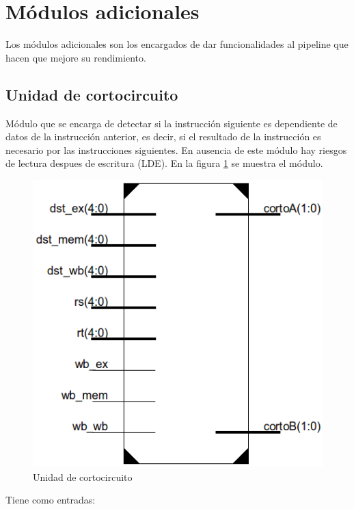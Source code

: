 \section{M\'odulos adicionales}
Los m\'odulos adicionales son los encargados de dar funcionalidades al pipeline que hacen que mejore su rendimiento.

\subsection{Unidad de cortocircuito}
M\'odulo que se encarga de detectar si la instrucci\'on siguiente es dependiente de datos de la instrucci\'on anterior, es decir, si el resultado de la instrucci\'on es necesario por las instrucciones siguientes. En ausencia de este m\'odulo hay riesgos de lectura despues de escritura (LDE). En la figura \ref{fig:fwd} se muestra el m\'odulo.

\begin{figure}[H]
\centering
\includegraphics[scale=0.5]{img/forwarding}
\caption{Unidad de cortocircuito}
\label{fig:fwd}
\end{figure}

Tiene como entradas:


